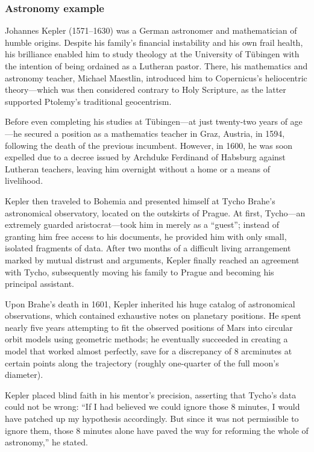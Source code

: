 \documentclass[11pt, a4paper]{article}
\begin{document}
\subsubsection{Astronomy example} \label{astro_example}

Johannes Kepler (1571–1630) was a German astronomer and mathematician of humble origins. Despite his family's financial instability and his own frail health, his brilliance enabled him to study theology at the University of Tübingen with the intention of being ordained as a Lutheran pastor. There, his mathematics and astronomy teacher, Michael Maestlin, introduced him to Copernicus's heliocentric theory—which was then considered contrary to Holy Scripture, as the latter supported Ptolemy's traditional geocentrism.

Before even completing his studies at Tübingen—at just twenty-two years of age—he secured a position as a mathematics teacher in Graz, Austria, in 1594, following the death of the previous incumbent. However, in 1600, he was soon expelled due to a decree issued by Archduke Ferdinand of Habsburg against Lutheran teachers, leaving him overnight without a home or a means of livelihood.

Kepler then traveled to Bohemia and presented himself at Tycho Brahe’s astronomical observatory, located on the outskirts of Prague. At first, Tycho—an extremely guarded aristocrat—took him in merely as a ``guest''; instead of granting him free access to his documents, he provided him with only small, isolated fragments of data. After two months of a difficult living arrangement marked by mutual distrust and arguments, Kepler finally reached an agreement with Tycho, subsequently moving his family to Prague and becoming his principal assistant.

Upon Brahe’s death in 1601, Kepler inherited his huge catalog of astronomical observations, which contained exhaustive notes on planetary positions. He spent nearly five years attempting to fit the observed positions of Mars into circular orbit models using geometric methods; he eventually succeeded in creating a model that worked almost perfectly, save for a discrepancy of 8 arcminutes at certain points along the trajectory (roughly one-quarter of the full moon's diameter).

Kepler placed blind faith in his mentor's precision, asserting that Tycho's data could not be wrong: ``If I had believed we could ignore those 8 minutes, I would have patched up my hypothesis accordingly. But since it was not permissible to ignore them, those 8 minutes alone have paved the way for reforming the whole of astronomy,'' he stated.
\end{document}
